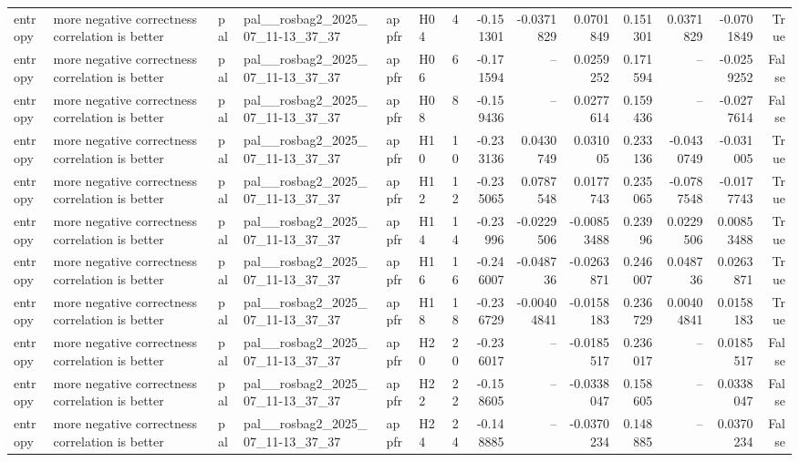 \begin{longtable}{llllllrrrrrrrr}
entropy & more negative correctness correlation is better & pal & pal\_\_rosbag2\_2025\_07\_11-13\_37\_37 & appfr & H04 & 4 & -0.151301 & -0.0371829 & 0.0701849 & 0.151301 & 0.0371829 & -0.0701849 & True \\
entropy & more negative correctness correlation is better & pal & pal\_\_rosbag2\_2025\_07\_11-13\_37\_37 & appfr & H06 & 6 & -0.171594 & -- & 0.0259252 & 0.171594 & -- & -0.0259252 & False \\
entropy & more negative correctness correlation is better & pal & pal\_\_rosbag2\_2025\_07\_11-13\_37\_37 & appfr & H08 & 8 & -0.159436 & -- & 0.0277614 & 0.159436 & -- & -0.0277614 & False \\
entropy & more negative correctness correlation is better & pal & pal\_\_rosbag2\_2025\_07\_11-13\_37\_37 & appfr & H10 & 10 & -0.233136 & 0.0430749 & 0.031005 & 0.233136 & -0.0430749 & -0.031005 & True \\
entropy & more negative correctness correlation is better & pal & pal\_\_rosbag2\_2025\_07\_11-13\_37\_37 & appfr & H12 & 12 & -0.235065 & 0.0787548 & 0.0177743 & 0.235065 & -0.0787548 & -0.0177743 & True \\
entropy & more negative correctness correlation is better & pal & pal\_\_rosbag2\_2025\_07\_11-13\_37\_37 & appfr & H14 & 14 & -0.23996 & -0.0229506 & -0.00853488 & 0.23996 & 0.0229506 & 0.00853488 & True \\
entropy & more negative correctness correlation is better & pal & pal\_\_rosbag2\_2025\_07\_11-13\_37\_37 & appfr & H16 & 16 & -0.246007 & -0.048736 & -0.0263871 & 0.246007 & 0.048736 & 0.0263871 & True \\
entropy & more negative correctness correlation is better & pal & pal\_\_rosbag2\_2025\_07\_11-13\_37\_37 & appfr & H18 & 18 & -0.236729 & -0.00404841 & -0.0158183 & 0.236729 & 0.00404841 & 0.0158183 & True \\
entropy & more negative correctness correlation is better & pal & pal\_\_rosbag2\_2025\_07\_11-13\_37\_37 & appfr & H20 & 20 & -0.236017 & -- & -0.0185517 & 0.236017 & -- & 0.0185517 & False \\
entropy & more negative correctness correlation is better & pal & pal\_\_rosbag2\_2025\_07\_11-13\_37\_37 & appfr & H22 & 22 & -0.158605 & -- & -0.0338047 & 0.158605 & -- & 0.0338047 & False \\
entropy & more negative correctness correlation is better & pal & pal\_\_rosbag2\_2025\_07\_11-13\_37\_37 & appfr & H24 & 24 & -0.148885 & -- & -0.0370234 & 0.148885 & -- & 0.0370234 & False \\

\end{longtable}
